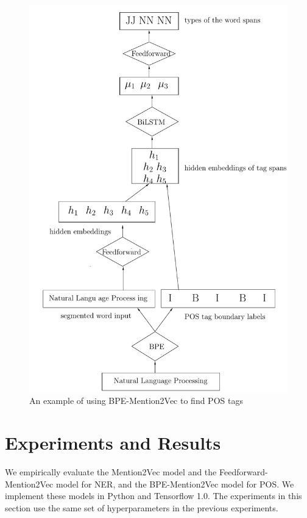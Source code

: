 \begin{figure}
  \centering
  \includegraphics[scale=0.6]{bpemention2vec.pdf}
 \caption{An example of using BPE-Mention2Vec to find POS tags}
  \label{fig:bpemention2vec}
\end{figure}

\section{Experiments and Results}

We empirically evaluate the Mention2Vec model and the Feedforward-Mention2Vec model for NER, and the BPE-Mention2Vec model for POS. We implement these models in Python and Tensorflow 1.0. The experiments in this section use the same set of hyperparameters in the previous experiments. 

